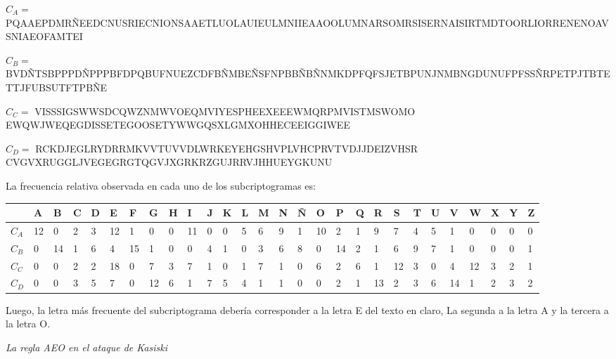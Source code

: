 \documentclass{article}
\begin{document}
$C_{A}=$ PQAAEPDMRÑEEDCNUSRIECNIONSAAETLUOLAUIEULMNIIEAAOOLUMNARSOMRSISERNAISIRTMDTOORLIORRENENOAVSNIAEOFAMTEI

$C_{B}=$ BVDÑTSBPPPDÑPPPBFDPQBUFNUEZCDFBÑMBEÑSFNPBBÑBÑNMKDPFQFSJETBPUNJNMBNGDUNUFPFSSÑRPETPJTBTETTJFUBSUTFTPBÑE

$C_{C}=$ VISSSIGSWWSDCQWZNMWVOEQMVIYESPHEEXEEEWMQRPMVISTMSWOMO
EWQWJWEQEGDISSETEGOOSETYWWGQSXLGMXOHHECEEIGGIWEE

$C_{D}=$ RCKDJEGLRYDRRMKVVTUVVDLWRKEYEHGSHVPLVHCPRVTVDJJDEIZVHSR
CVGVXRUGGLJVEGEGRGTQGVJXGRKRZGUJRRVJHHUEYGKUNU


La frecuencia relativa observada en cada uno de los subcriptogramas es:
\

\begin{table}[htbp]

\tabcolsep=0.11cm %

\begin{tabular}{l|lllllllllllllllllllllllllll}
 

 & A & B & C & D & E & F & G & H & I & J & K & L & M & N  & Ñ & O & P & Q & R & S & T & U & V & W & X & Y & Z \\ \hline
 $C_A$ & 12 & 0 & 2 & 3 & 12 & 1 & 0 & 0 & 11 & 0 & 0 & 5 & 6 & 9 & 1 & 10 & 2 & 1 & 9 & 7 & 4 & 5 & 1 & 0 & 0 & 0 & 0\\
 $C_B$ & 0 & 14 & 1 & 6 & 4 & 15 & 1 & 0 & 0 & 4 & 1 & 0 & 3 & 6 & 8 & 0 & 14 & 2 & 1 & 6 & 9 & 7 & 1 & 0 & 0 & 0 & 1\\
 $C_C$ & 0 & 0 & 2 & 2 & 18 & 0 & 7 & 3 & 7 & 1 & 0 & 1 & 7 & 1 & 0 & 6 & 2 & 6 & 1 & 12 & 3 & 0 & 4 & 12 & 3 & 2 & 1 \\
 $C_D$ & 0 & 0 & 3 & 5 & 7 & 0 & 12 & 6 & 1 & 7 & 5 & 4 & 1 & 1 & 0 & 0 & 2 & 1 & 13 & 2 & 3 & 6 & 14 & 1 & 2 & 3 & 2\\
 
\end{tabular}
\label{tabla:sencilla}

\end{table}



Luego, la letra más frecuente del subcriptograma debería corresponder a la letra E del texto en claro, La segunda a la letra A y la tercera a la letra O.

\textsl{\large La regla AEO en el ataque de Kasiski}
\end{document}
